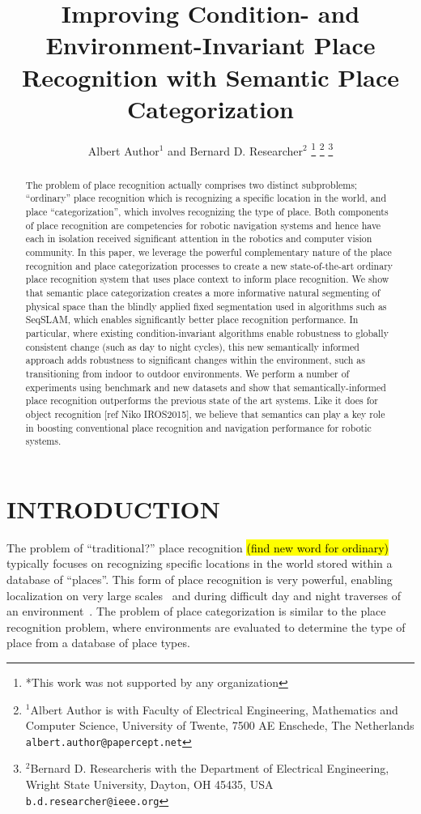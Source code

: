 \documentclass[letterpaper, 10 pt, conference]{ieeeconf}  %
\title{\LARGE \bf
Improving Condition- and Environment-Invariant Place Recognition with Semantic Place Categorization
}
\author{Albert Author$^{1}$ and Bernard D. Researcher$^{2}$%
\thanks{*This work was not supported by any organization}%
\thanks{$^{1}$Albert Author is with Faculty of Electrical Engineering, Mathematics and Computer Science,
        University of Twente, 7500 AE Enschede, The Netherlands
        {\tt\small albert.author@papercept.net}}%
\thanks{$^{2}$Bernard D. Researcheris with the Department of Electrical Engineering, Wright State University,
        Dayton, OH 45435, USA
        {\tt\small b.d.researcher@ieee.org}}%
}
\begin{document}
\maketitle
\thispagestyle{empty}
\pagestyle{empty}


\begin{abstract}
The problem of place recognition actually comprises two distinct subproblems; ``ordinary'' place recognition which is recognizing a specific location in the world, and place ``categorization'', which involves recognizing the type of place. Both components of place recognition are competencies for robotic navigation systems and hence have each in isolation received significant attention in the robotics and computer vision community. In this paper, we leverage the powerful complementary nature of the place recognition and place categorization processes to create a new state-of-the-art ordinary place recognition system that uses place context to inform place recognition. We show that semantic place categorization creates a more informative natural segmenting of physical space than the blindly applied fixed segmentation used in algorithms such as SeqSLAM, which enables significantly better place recognition performance. In particular, where existing condition-invariant algorithms enable robustness to globally consistent change (such as day to night cycles), this new semantically informed approach adds robustness to significant changes within the environment, such as transitioning from indoor to outdoor environments. We perform a number of experiments using benchmark and new datasets and show that semantically-informed place recognition outperforms the previous state of the art systems. Like it does for object recognition [ref Niko IROS2015], we believe that  semantics can play a key role in boosting conventional place recognition and navigation performance for robotic systems.
\end{abstract}

\section{INTRODUCTION}


The problem of ``traditional?'' place recognition \hl{(find new word for ordinary)} typically focuses on recognizing specific locations in the world stored within a database of ``places''. This form of place recognition is very powerful, enabling localization on very large scales~\cite{Cummins2009} and during difficult day and night traverses of an environment~\cite{Milford2012}. The problem of place categorization is similar to the place recognition problem, where environments are evaluated to determine the type of place from a database of place types. 
\end{document}

